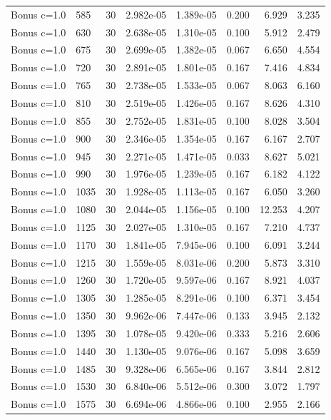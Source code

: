 \begin{scriptsize}
\begin{longtable}{llrrrrrr}
Bonus c=1.0 & 585 & 30 & 2.982e-05 & 1.389e-05 & 0.200 & 6.929 & 3.235 \\
Bonus c=1.0 & 630 & 30 & 2.638e-05 & 1.310e-05 & 0.100 & 5.912 & 2.479 \\
Bonus c=1.0 & 675 & 30 & 2.699e-05 & 1.382e-05 & 0.067 & 6.650 & 4.554 \\
Bonus c=1.0 & 720 & 30 & 2.891e-05 & 1.801e-05 & 0.167 & 7.416 & 4.834 \\
Bonus c=1.0 & 765 & 30 & 2.738e-05 & 1.533e-05 & 0.067 & 8.063 & 6.160 \\
Bonus c=1.0 & 810 & 30 & 2.519e-05 & 1.426e-05 & 0.167 & 8.626 & 4.310 \\
Bonus c=1.0 & 855 & 30 & 2.752e-05 & 1.831e-05 & 0.100 & 8.028 & 3.504 \\
Bonus c=1.0 & 900 & 30 & 2.346e-05 & 1.354e-05 & 0.167 & 6.167 & 2.707 \\
Bonus c=1.0 & 945 & 30 & 2.271e-05 & 1.471e-05 & 0.033 & 8.627 & 5.021 \\
Bonus c=1.0 & 990 & 30 & 1.976e-05 & 1.239e-05 & 0.167 & 6.182 & 4.122 \\
Bonus c=1.0 & 1035 & 30 & 1.928e-05 & 1.113e-05 & 0.167 & 6.050 & 3.260 \\
Bonus c=1.0 & 1080 & 30 & 2.044e-05 & 1.156e-05 & 0.100 & 12.253 & 4.207 \\
Bonus c=1.0 & 1125 & 30 & 2.027e-05 & 1.310e-05 & 0.167 & 7.210 & 4.737 \\
Bonus c=1.0 & 1170 & 30 & 1.841e-05 & 7.945e-06 & 0.100 & 6.091 & 3.244 \\
Bonus c=1.0 & 1215 & 30 & 1.559e-05 & 8.031e-06 & 0.200 & 5.873 & 3.310 \\
Bonus c=1.0 & 1260 & 30 & 1.720e-05 & 9.597e-06 & 0.167 & 8.921 & 4.037 \\
Bonus c=1.0 & 1305 & 30 & 1.285e-05 & 8.291e-06 & 0.100 & 6.371 & 3.454 \\
Bonus c=1.0 & 1350 & 30 & 9.962e-06 & 7.447e-06 & 0.133 & 3.945 & 2.132 \\
Bonus c=1.0 & 1395 & 30 & 1.078e-05 & 9.420e-06 & 0.333 & 5.216 & 2.606 \\
Bonus c=1.0 & 1440 & 30 & 1.130e-05 & 9.076e-06 & 0.167 & 5.098 & 3.659 \\
Bonus c=1.0 & 1485 & 30 & 9.328e-06 & 6.565e-06 & 0.167 & 3.844 & 2.812 \\
Bonus c=1.0 & 1530 & 30 & 6.840e-06 & 5.512e-06 & 0.300 & 3.072 & 1.797 \\
Bonus c=1.0 & 1575 & 30 & 6.694e-06 & 4.866e-06 & 0.100 & 2.955 & 2.166 \\

\end{longtable}
\end{scriptsize}
